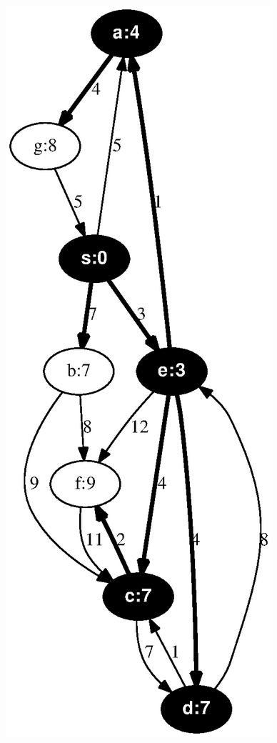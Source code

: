 \documentclass{article}
\begin{document}
\includegraphics[width=0.303030303030303\linewidth]{dijkstra_gross_yellen_05.eps}
\vspace{1em}
\end{document}
